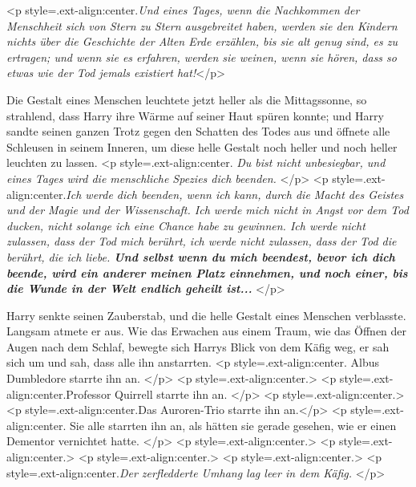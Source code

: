 <p style=\grqq{}.ext-align:center\grqq{}.\emph{Und eines Tages, wenn die
Nachkommen der Menschheit sich von Stern zu Stern ausgebreitet haben, werden sie
den Kindern nichts über die Geschichte der Alten Erde erzählen, bis sie alt
genug sind, es zu ertragen; und wenn sie es erfahren, werden sie weinen, wenn
sie hören, dass so etwas wie der Tod jemals existiert hat!}</p>

Die Gestalt eines Menschen leuchtete jetzt heller als die Mittagssonne, so
strahlend, dass Harry ihre Wärme auf seiner Haut spüren konnte; und Harry sandte
seinen ganzen Trotz gegen den Schatten des Todes aus und öffnete alle Schleusen
in seinem Inneren, um diese helle Gestalt noch heller und noch heller leuchten
zu lassen. <p style=\grqq{}.ext-align:center\grqq{}. \emph{ Du bist nicht
unbesiegbar, und eines Tages wird die menschliche Spezies dich beenden.} </p> <p
style=\grqq{}.ext-align:center\grqq{}.\emph{Ich werde dich beenden, wenn ich
kann, durch die Macht des Geistes und der Magie und der Wissenschaft. Ich werde
mich nicht in Angst vor dem Tod ducken, nicht solange ich eine Chance habe zu
gewinnen. Ich werde nicht zulassen, dass der Tod mich berührt, ich werde nicht
zulassen, dass der Tod die berührt, die ich liebe. \textbf{ Und selbst wenn du
mich beendest, bevor ich dich beende, wird ein anderer meinen Platz einnehmen,
und noch einer, bis die Wunde in der Welt endlich geheilt ist...} }</p>

Harry senkte seinen Zauberstab, und die helle Gestalt eines Menschen verblasste.
Langsam atmete er aus. Wie das Erwachen aus einem Traum, wie das Öffnen der
Augen nach dem Schlaf, bewegte sich Harrys Blick von dem Käfig weg, er sah sich
um und sah, dass alle ihn anstarrten. <p style=\grqq{}.ext-align:center\grqq{}.
Albus Dumbledore starrte ihn an. </p> <p style=\grqq{}.ext-align:center\grqq{}.>
<p style=\grqq{}.ext-align:center\grqq{}.Professor Quirrell starrte ihn an. </p>
<p style=\grqq{}.ext-align:center\grqq{}.> <p
style=\grqq{}.ext-align:center\grqq{}.Das Auroren-Trio starrte ihn an.</p> <p
style=\grqq{}.ext-align:center\grqq{}. Sie alle starrten ihn an, als hätten sie
gerade gesehen, wie er einen Dementor vernichtet hatte. </p> <p
style=\grqq{}.ext-align:center\grqq{}.> <p
style=\grqq{}.ext-align:center\grqq{}.> <p
style=\grqq{}.ext-align:center\grqq{}.> <p
style=\grqq{}.ext-align:center\grqq{}.> <p
style=\grqq{}.ext-align:center\grqq{}.\emph{Der zerfledderte Umhang lag leer in
dem Käfig.} </p>


